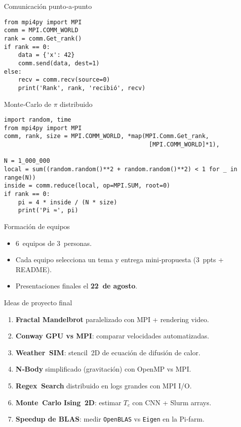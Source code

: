 \documentclass[aspectratio=169,professionalfonts]{beamer}
\begin{document}
\begin{frame}[fragile]{Comunicación punto‑a‑punto}
  \begin{verbatim}
from mpi4py import MPI
comm = MPI.COMM_WORLD
rank = comm.Get_rank()
if rank == 0:
    data = {'x': 42}
    comm.send(data, dest=1)
else:
    recv = comm.recv(source=0)
    print('Rank', rank, 'recibió', recv)
  \end{verbatim}
\end{frame}

\begin{frame}[fragile]{Monte‑Carlo de \(\pi\) distribuido}
  \begin{verbatim}
import random, time
from mpi4py import MPI
comm, rank, size = MPI.COMM_WORLD, *map(MPI.Comm.Get_rank,
                                         [MPI.COMM_WORLD]*1),

N = 1_000_000
local = sum((random.random()**2 + random.random()**2) < 1 for _ in range(N))
inside = comm.reduce(local, op=MPI.SUM, root=0)
if rank == 0:
    pi = 4 * inside / (N * size)
    print('Pi ≈', pi)
  \end{verbatim}
\end{frame}

\begin{frame}[fragile]{Formación de equipos}
  \begin{itemize}
    \item 6 equipos de 3 personas.
    \item Cada equipo selecciona un tema y entrega mini‑propuesta (3 ppts + README).
    \item Presentaciones finales el \textbf{22 de agosto}.
  \end{itemize}
\end{frame}

\begin{frame}[fragile]{Ideas de proyecto final}
  \begin{enumerate}
    \item \textbf{Fractal Mandelbrot} paralelizado con MPI + rendering video.
    \item \textbf{Conway GPU vs MPI}: comparar velocidades automatizadas.
    \item \textbf{Weather SIM}: stencil 2D de ecuación de difusión de calor.
    \item \textbf{N‑Body} simplificado (gravitación) con OpenMP vs MPI.
    \item \textbf{Regex Search} distribuido en logs grandes con MPI I/O.
    \item \textbf{Monte Carlo Ising 2D}: estimar \(T_c\) con CNN + Slurm arrays.
    \item \textbf{Speedup de BLAS}: medir \texttt{OpenBLAS} vs \texttt{Eigen} en la Pi‑farm.
  \end{enumerate}
\end{frame}
\end{document}
